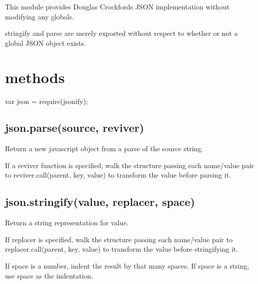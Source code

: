 This module provides Douglas Crockford\textquotesingle{}s J\+S\+ON implementation without modifying any globals.

{\ttfamily stringify} and {\ttfamily parse} are merely exported without respect to whether or not a global {\ttfamily J\+S\+ON} object exists.

\section*{methods }

var json = require(\textquotesingle{}jsonify\textquotesingle{});

\subsection*{json.\+parse(source, reviver) }

Return a new javascript object from a parse of the {\ttfamily source} string.

If a {\ttfamily reviver} function is specified, walk the structure passing each name/value pair to {\ttfamily reviver.\+call(parent, key, value)} to transform the {\ttfamily value} before parsing it.

\subsection*{json.\+stringify(value, replacer, space) }

Return a string representation for {\ttfamily value}.

If {\ttfamily replacer} is specified, walk the structure passing each name/value pair to {\ttfamily replacer.\+call(parent, key, value)} to transform the {\ttfamily value} before stringifying it.

If {\ttfamily space} is a number, indent the result by that many spaces. If {\ttfamily space} is a string, use {\ttfamily space} as the indentation. 